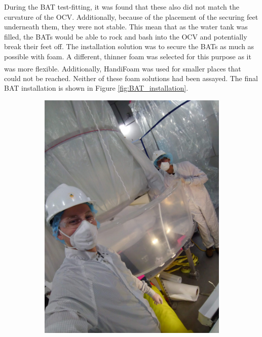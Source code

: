 \par
During the BAT test-fitting, it was found that these also did not match the curvature of the OCV.
Additionally, because of the placement of the securing feet underneath them, they were not stable.
This mean that as the water tank was filled, the BATs would be able to rock and bash into the OCV and potentially break their feet off.
The installation solution was to secure the BATs as much as possible with foam.
A different, thinner foam was selected for this purpose as it was more flexible.
Additionally, HandiFoam\textsuperscript{\textregistered} was used for smaller places that could not be reached.
Neither of these foam solutions had been assayed.
The final BAT installation is shown in Figure \ref{fig:BAT_installation}.

\begin{figure}[!htbp]
\begin{subfigure}{.5\textwidth}
  \centering
  \includegraphics[angle=90, width=\linewidth]{Figures/Construction/BAT_installation.jpg}

\end{subfigure}
\end{figure}
